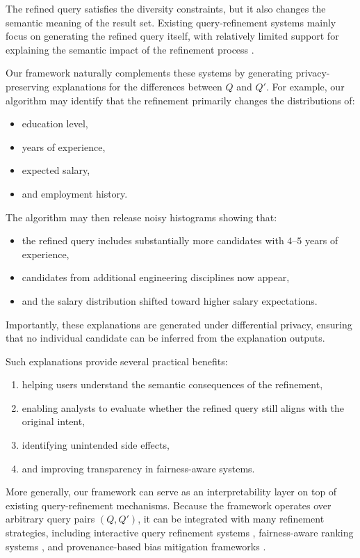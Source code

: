 The refined query satisfies the diversity constraints,
but it also changes the semantic meaning of the result set.
Existing query-refinement systems mainly focus on generating the refined query itself,
with relatively limited support for explaining the semantic impact
of the refinement process \cite{mishra2009,erica2023}.

Our framework naturally complements these systems by generating
privacy-preserving explanations for the differences between $Q$
and $Q'$.
For example, our algorithm may identify that the refinement
primarily changes the distributions of:
\begin{itemize}
    \item education level,
    \item years of experience,
    \item expected salary,
    \item and employment history.
\end{itemize}

The algorithm may then release noisy histograms showing that:
\begin{itemize}
    \item the refined query includes substantially more candidates
    with $4$--$5$ years of experience,
    \item candidates from additional engineering disciplines now appear,
    \item and the salary distribution shifted toward higher salary expectations.
\end{itemize}

Importantly, these explanations are generated under differential privacy,
ensuring that no individual candidate can be inferred from the explanation outputs.

Such explanations provide several practical benefits:
\begin{enumerate}
    \item helping users understand the semantic consequences of the refinement,
    \item enabling analysts to evaluate whether the refined query still aligns
    with the original intent,
    \item identifying unintended side effects,
    \item and improving transparency in fairness-aware systems.
\end{enumerate}

More generally, our framework can serve as an interpretability layer
on top of existing query-refinement mechanisms.
Because the framework operates over arbitrary query pairs $(Q,Q')$,
it can be integrated with many refinement strategies,
including interactive query refinement systems \cite{mishra2009},
fairness-aware ranking systems \cite{stoyanovich2018},
and provenance-based bias mitigation frameworks \cite{moskovitch2022}.

